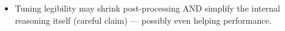 \begin{itemize}
    \item Tuning legibility may shrink post-processing AND simplify the internal reasoning itself (careful claim) — possibly even helping performance. 

\end{itemize}
